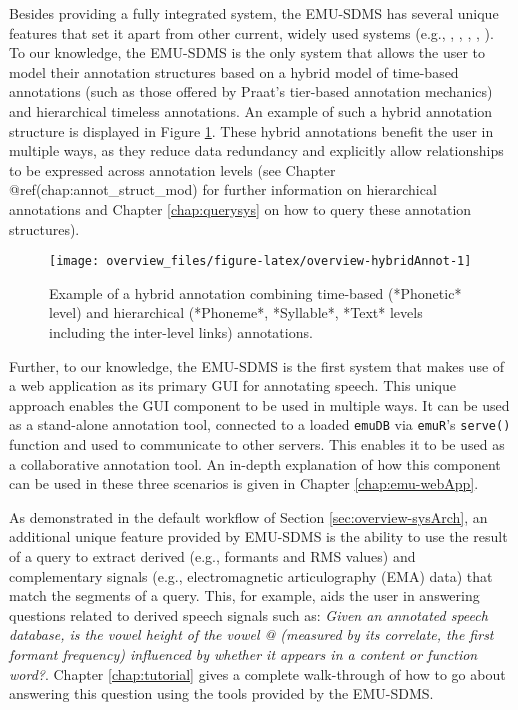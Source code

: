 \documentclass[
]{book}
\begin{document}
Besides providing a fully integrated system, the EMU-SDMS has several unique features that set it apart from other current, widely used systems (e.g., \citet{boersma:2011a}, \citet{wittenburg:2006a}, \citet{fromont:2012a}, \citet{rose:2006a}, \citet{mcauliffe:2016a}). To our knowledge, the EMU-SDMS is the only system that allows the user to model their annotation structures based on a hybrid model of time-based annotations (such as those offered by Praat's tier-based annotation mechanics) and hierarchical timeless annotations. An example of such a hybrid annotation structure is displayed in Figure \ref{fig:overview-hybridAnnot}. These hybrid annotations benefit the user in multiple ways, as they reduce data redundancy and explicitly allow relationships to be expressed across annotation levels (see Chapter @ref(chap:annot\_struct\_mod) for further information on hierarchical annotations and Chapter \ref{chap:querysys} on how to query these annotation structures).

\begin{figure}

{\centering \texttt{[image: overview\_files/figure-latex/overview-hybridAnnot-1]} 

}

\caption{Example of a hybrid annotation combining time-based (*Phonetic* level) and hierarchical (*Phoneme*, *Syllable*, *Text* levels including the inter-level links) annotations.}\label{fig:overview-hybridAnnot}
\end{figure}

Further, to our knowledge, the EMU-SDMS is the first system that makes use of a web application as its primary GUI for annotating speech. This unique approach enables the GUI component to be used in multiple ways. It can be used as a stand-alone annotation tool, connected to a loaded \texttt{emuDB} via \texttt{emuR}'s \texttt{serve()} function and used to communicate to other servers. This enables it to be used as a collaborative annotation tool. An in-depth explanation of how this component can be used in these three scenarios is given in Chapter \ref{chap:emu-webApp}.

As demonstrated in the default workflow of Section \ref{sec:overview-sysArch}, an additional unique feature provided by EMU-SDMS is the ability to use the result of a query to extract derived (e.g., formants and RMS values) and complementary signals (e.g., electromagnetic articulography (EMA) data) that match the segments of a query. This, for example, aids the user in answering questions related to derived speech signals such as: \emph{Given an annotated speech database, is the vowel height of the vowel @ (measured by its correlate, the first formant frequency) influenced by whether it appears in a content or function word?}. Chapter \ref{chap:tutorial} gives a complete walk-through of how to go about answering this question using the tools provided by the EMU-SDMS.
\end{document}

